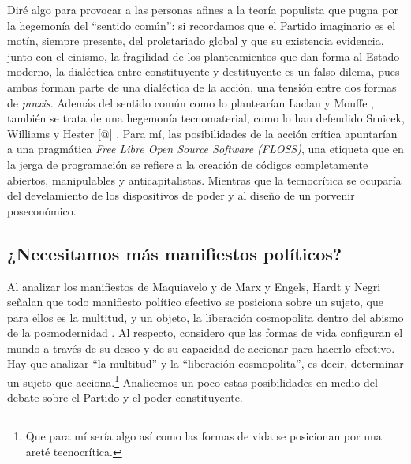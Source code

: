 Diré algo para provocar a las personas afines a la teoría populista que pugna por la hegemonía del \enquote{sentido común}: si recordamos que el Partido imaginario es el motín, siempre presente, del proletariado global y que su existencia evidencia, junto con el cinismo, la fragilidad de los planteamientos que dan forma al Estado moderno, la dialéctica entre constituyente y destituyente es un falso dilema, pues ambas forman parte de una dialéctica de la acción, una tensión entre dos formas de \emph{praxis}. Además del sentido común como lo plantearían Laclau y Mouffe \autocite{laclauRazonPopulista2016}, también se trata de una hegemonía tecnomaterial, como lo han defendido Srnicek, Williams y Hester [@\autocite{hesterXenofeminism2018}] . Para mí, las posibilidades de la acción crítica apuntarían a una pragmática \emph{Free Libre Open Source Software (FLOSS)}, una etiqueta que en la jerga de programación se refiere a la creación de códigos completamente abiertos, manipulables y anticapitalistas. Mientras que la tecnocrítica se ocuparía del develamiento de los dispositivos de poder y al diseño de un porvenir poseconómico.

\subsection{¿Necesitamos más manifiestos políticos?}
\label{necesitamos-muxe1s-manifiestos-políticos}

Al analizar los manifiestos de Maquiavelo y de Marx y Engels, Hardt y Negri señalan que todo manifiesto político efectivo se posiciona sobre un sujeto, que para ellos es la multitud, y un objeto, la liberación cosmopolita dentro del abismo de la posmodernidad \autocite[p.~64]{hardtImperio2005}. Al respecto, considero que las formas de vida configuran el mundo a través de su deseo y de su capacidad de accionar para hacerlo efectivo. Hay que analizar \enquote{la multitud} y la \enquote{liberación cosmopolita}, es decir, determinar un sujeto que acciona.\footnote{Que para mí sería algo así como las formas de vida se posicionan por una areté tecnocrítica.} Analicemos un poco estas posibilidades en medio del debate sobre el Partido y el poder constituyente.

